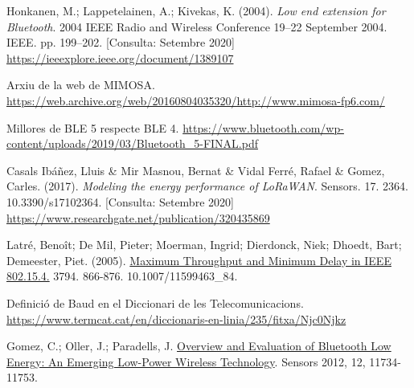 \begin{thebibliography}{2}


Honkanen, M.; Lappetelainen, A.; Kivekas, K. (2004). \textit{Low end extension for Bluetooth}. 2004 IEEE Radio and Wireless Conference 19–22 September 2004. IEEE. pp. 199–202.
[Consulta: Setembre 2020] \href{https://ieeexplore.ieee.org/document/1389107}{https://ieeexplore.ieee.org/document/1389107}

Arxiu de la web de MIMOSA.\newline
\href{https://web.archive.org/web/20160804035320/http://www.mimosa-fp6.com/}{https://web.archive.org/web/20160804035320/http://www.mimosa-fp6.com/}


Millores de BLE 5 respecte BLE 4.\newline
\href{https://www.bluetooth.com/wp-content/uploads/2019/03/Bluetooth\_5-FINAL.pdf}{https://www.bluetooth.com/wp-content/uploads/2019/03/Bluetooth\_5-FINAL.pdf}

Casals Ibáñez, Lluis \& Mir Masnou, Bernat \& Vidal Ferré, Rafael \& Gomez, Carles. (2017). \textit{Modeling the energy performance of LoRaWAN}. Sensors. 17. 2364. 10.3390/s17102364.
[Consulta: Setembre 2020]
\href{https://www.researchgate.net/publication/320435869}{https://www.researchgate.net/publication/320435869}

Latré, Benoît; De Mil, Pieter; Moerman, Ingrid; Dierdonck, Niek; Dhoedt, Bart; Demeester, Piet. (2005). \href{https://www.researchgate.net/publication/220963645_Maximum_Throughput_and_Minimum_Delay_in_IEEE_802154}{Maximum Throughput and Minimum Delay in IEEE 802.15.4.} 3794. 866-876. 10.1007/11599463\_84. 

Definició de Baud en el Diccionari de les Telecomunicacions.\newline
\href{https://www.termcat.cat/en/diccionaris-en-linia/235/fitxa/Njc0Njkz}{https://www.termcat.cat/en/diccionaris-en-linia/235/fitxa/Njc0Njkz}

Gomez, C.; Oller, J.; Paradells, J.  \href{https://www.mdpi.com/1424-8220/12/9/11734}{Overview and Evaluation of Bluetooth Low Energy: An Emerging Low-Power Wireless Technology}. Sensors 2012, 12, 11734-11753.


\end{thebibliography}
